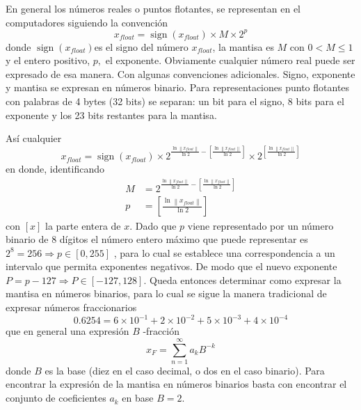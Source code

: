 \documentclass[spanish,titlepage,11pt]{article}
\begin{document}
En general los n\'{u}meros reales o puntos flotantes, se representan en el
computadores siguiendo la convenci\'{o}n
\begin{equation}
x_{float}=\operatorname*{sign}\left(  x_{float}\right)  \times M\times2^{p}%
\end{equation}
donde $\operatorname*{sign}\left(  x_{float}\right)  $es el signo del
n\'{u}mero $x_{float}$, la mantisa es $M$ con $0<M\leq1$ y el entero positivo,
$p,$ el exponente. Obviamente cualquier n\'{u}mero real puede ser expresado de
esa manera. Con algunas convenciones adicionales. Signo, exponente y mantisa
se expresan en n\'{u}meros binario. Para representaciones punto flotantes con
palabras de 4 bytes (32 bits) se separan: un bit para el signo, 8 bits para el
exponente y los 23 bits restantes para la mantisa.

As\'{i} cualquier
\begin{equation}
x_{float}=\operatorname*{sign}\left(  x_{float}\right)  \times2^{\frac
{\ln\left\|  x_{float}\right\|  }{\ln2}-\left[  \frac{\ln\left\|
x_{float}\right\|  }{\ln2}\right]  }\times2^{\left[  \frac{\ln\left\|
x_{float}\right\|  }{\ln2}\right]  }%
\end{equation}
en donde, identificando
\begin{align}
M &  =2^{\frac{\ln\left\|  x_{float}\right\|  }{\ln2}-\left[  \frac
{\ln\left\|  x_{float}\right\|  }{\ln2}\right]  }\\
p &  =\left[  \frac{\ln\left\|  x_{float}\right\|  }{\ln2}\right]
\end{align}
con $\left[  x\right]  $ la parte entera de $x.$ Dado que $p$ viene
representado por un n\'{u}mero binario de 8 d\'{i}gitos el n\'{u}mero entero
m\'{a}ximo que puede representar es $2^{8}=256\Longrightarrow p\in\left[
0,255\right]  $ , para lo cual se establece una correspondencia a un intervalo
que permita exponentes negativos. De modo que el nuevo exponente
$P=p-127\Longrightarrow P\in\left[  -127,128\right]  .$ Queda entonces
determinar como expresar la mantisa en n\'{u}meros binarios, para lo cual se
sigue la manera tradicional de expresar n\'{u}meros fraccionarios
\begin{equation}
0.6254=6\times10^{-1}+2\times10^{-2}+5\times10^{-3}+4\times10^{-4}%
\end{equation}
que en general una expresi\'{o}n $B$ -fracci\'{o}n
\begin{equation}
x_{F}=\sum_{n=1}^{\infty}a_{k}B^{-k}%
\end{equation}
donde $B$ es la base (diez en el caso decimal, o dos en el caso binario). Para
encontrar la expresi\'{o}n de la mantisa en n\'{u}meros binarios basta con
encontrar el conjunto de coeficientes $a_{k}$ en base $B=2.$ 
\end{document}
